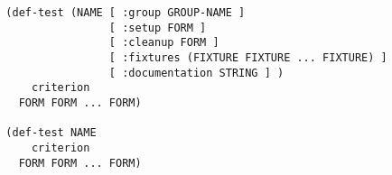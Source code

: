 \begin{verbatim}
  (def-test (NAME [ :group GROUP-NAME ]
                  [ :setup FORM ]
                  [ :cleanup FORM ]
                  [ :fixtures (FIXTURE FIXTURE ... FIXTURE) ]
                  [ :documentation STRING ] )
      criterion
    FORM FORM ... FORM)

  (def-test NAME
      criterion
    FORM FORM ... FORM)
\end{verbatim}

